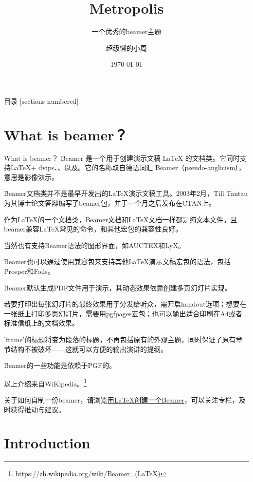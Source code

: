 \documentclass[10pt,UTF8]{ctexbeamer}
\title{Metropolis} %
\subtitle{一个优秀的beamer主题} %
\date{\today} %
\author{超级懒的小周} %
\institute{texpage.com} %
\begin{document}
\maketitle %

\begin{frame}{目录}
  [sections numbered]
  \tableofcontents%
\end{frame}

\section{What is beamer？}
\begin{frame}[allowframebreaks]{What is beamer？}
	Beamer 是一个用于创建演示文稿 LaTeX 的文档类。它同时支持\LaTeX + dvips、、以及。它的名称取自德语词汇 Beamer（pseudo-anglicism），意思是影像演示。
	
	Beamer文档类并不是最早开发出的\LaTeX 演示文稿工具。2003年2月，Till Tantau为其博士论文答辩编写了beamer包，并于一个月之后发布在CTAN上。
	
	作为LaTeX的一个文档类，Beamer文档和\LaTeX 文档一样都是纯文本文件。且beamer兼容\LaTeX 常见的命令，和其他宏包的兼容性良好。
	
	当然也有支持Beamer语法的图形界面，如AUCTEX和LyX。
	
	Beamer也可以通过使用兼容包来支持其他LaTeX演示文稿宏包的语法，包括 Prosper和Foils。
	
	Beamer默认生成PDF文件用于演示，其动态效果依靠创建多页幻灯片实现。
	
	若要打印出每张幻灯片的最终效果用于分发给听众，需开启handout选项；想要在一张纸上打印多页幻灯片，需要用pgfpages宏包；也可以输出适合印刷在A4或者标准信纸上的文档效果。
	
	'frame'的标题将变为段落的标题，不再包括原有的外观主题，同时保证了原有章节结构不被破坏——这就可以方便的输出演讲的提纲。
	
	Beamer的一些功能是依赖于PGF的。
	
	以上介绍来自WiKipedia。\footnote{https://zh.wikipedia.org/wiki/Beamer\_(LaTeX)}
	
	关于如何自制一份beamer，请浏览\href{https://zhuanlan.zhihu.com/p/423443762}{用LaTeX创建一个Beamer}，可以关注专栏，及时获得推动与建议。
\end{frame}

\section[Intro]{Introduction}
\end{document}
